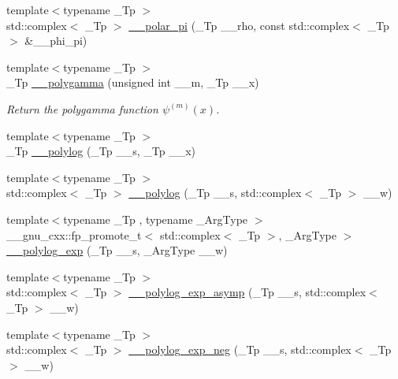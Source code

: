 \begin{DoxyCompactItemize}
{\footnotesize template$<$typename \+\_\+\+Tp $>$ }\\std\+::complex$<$ \+\_\+\+Tp $>$ \hyperlink{namespacestd_1_1____detail_a627c0e19f6b3e90af25735f351662d53}{\+\_\+\+\_\+polar\+\_\+pi} (\+\_\+\+Tp \+\_\+\+\_\+rho, const std\+::complex$<$ \+\_\+\+Tp $>$ \&\+\_\+\+\_\+phi\+\_\+pi)
\item 
{\footnotesize template$<$typename \+\_\+\+Tp $>$ }\\\+\_\+\+Tp \hyperlink{namespacestd_1_1____detail_a25cc1b7c8adbc3b0fc8d4487ab23571c}{\+\_\+\+\_\+polygamma} (unsigned int \+\_\+\+\_\+m, \+\_\+\+Tp \+\_\+\+\_\+x)
\begin{DoxyCompactList}\small\item\em Return the polygamma function $ \psi^{(m)}(x) $. \end{DoxyCompactList}\item 
{\footnotesize template$<$typename \+\_\+\+Tp $>$ }\\\+\_\+\+Tp \hyperlink{namespacestd_1_1____detail_a17fb8cea11706f319aaea277188a29c8}{\+\_\+\+\_\+polylog} (\+\_\+\+Tp \+\_\+\+\_\+s, \+\_\+\+Tp \+\_\+\+\_\+x)
\item 
{\footnotesize template$<$typename \+\_\+\+Tp $>$ }\\std\+::complex$<$ \+\_\+\+Tp $>$ \hyperlink{namespacestd_1_1____detail_aa14e3ca6e4bee5ac1f1e5e1c2cee1d5a}{\+\_\+\+\_\+polylog} (\+\_\+\+Tp \+\_\+\+\_\+s, std\+::complex$<$ \+\_\+\+Tp $>$ \+\_\+\+\_\+w)
\item 
{\footnotesize template$<$typename \+\_\+\+Tp , typename \+\_\+\+Arg\+Type $>$ }\\\+\_\+\+\_\+gnu\+\_\+cxx\+::fp\+\_\+promote\+\_\+t$<$ std\+::complex$<$ \+\_\+\+Tp $>$, \+\_\+\+Arg\+Type $>$ \hyperlink{namespacestd_1_1____detail_a0f6f2fc92d4ccec43975a6b9aca9851a}{\+\_\+\+\_\+polylog\+\_\+exp} (\+\_\+\+Tp \+\_\+\+\_\+s, \+\_\+\+Arg\+Type \+\_\+\+\_\+w)
\item 
{\footnotesize template$<$typename \+\_\+\+Tp $>$ }\\std\+::complex$<$ \+\_\+\+Tp $>$ \hyperlink{namespacestd_1_1____detail_af3684fc449da490e9a43985245618a90}{\+\_\+\+\_\+polylog\+\_\+exp\+\_\+asymp} (\+\_\+\+Tp \+\_\+\+\_\+s, std\+::complex$<$ \+\_\+\+Tp $>$ \+\_\+\+\_\+w)
\item 
{\footnotesize template$<$typename \+\_\+\+Tp $>$ }\\std\+::complex$<$ \+\_\+\+Tp $>$ \hyperlink{namespacestd_1_1____detail_a07b26b8c7ff467310e4e1df6e3efd893}{\+\_\+\+\_\+polylog\+\_\+exp\+\_\+neg} (\+\_\+\+Tp \+\_\+\+\_\+s, std\+::complex$<$ \+\_\+\+Tp $>$ \+\_\+\+\_\+w)

\end{DoxyCompactItemize}
